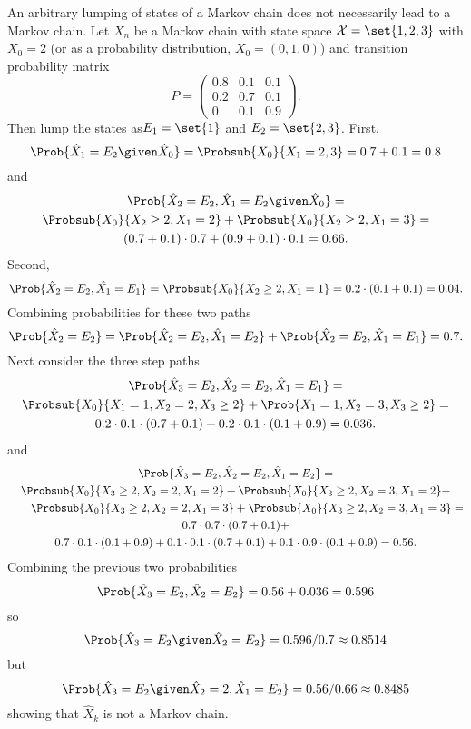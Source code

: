\documentclass[12pt]{article}
\begin{document}
\begin{example}
    An arbitrary lumping of states of a Markov chain does not
    necessarily lead to a Markov chain.  Let \( X_n \) be a Markov chain
    with state space \( \mathcal{X} = \set{1, 2, 3} \) with \( X_0 = 2 \)
    (or as a probability distribution, \( X_0 = (0,1,0) \)) and
    transition probability matrix
    \[
        P =
        \begin{pmatrix}
            0.8 & 0.1 & 0.1 \\
            0.2 & 0.7 & 0.1 \\
            0 & 0.1 & 0.9
        \end{pmatrix}
        .
      \] Then lump the states as\( E_1 = \set{1} \) and \( E_2 = \set{2,3}
      \).  First,
      \[
        \Prob{\hat{X}_1 = E_2 \given \hat{X}_0} =
        \Probsub{X_0}{X_1 = 2,3} = 0.7 + 0.1 = 0.8
      \] and
    \begin{multline*}
        \Prob{\hat{X}_2 = E_2, \hat{X}_1 = E_2 \given \hat{X}_0 } = \\
        \Probsub{X_0}{X_2 \ge 2, X_1 = 2} + \Probsub{X_0}{X_2 \ge 2, X_1 =
        3} = \\
        (0.7 + 0.1) \cdot 0.7 + (0.9 + 0.1) \cdot 0.1 = 0.66.
    \end{multline*}
    Second,
    \[
        \Prob{\hat{X}_2 = E_2, \hat{X_1} = E_1} = \Probsub{X_0}{ X_2 \ge
        2, X_1 = 1} = 0.2 \cdot (0.1 + 0.1) = 0.04.
    \] Combining probabilities for these two paths
    \[
        \Prob{\hat{X}_2 = E_2} = \Prob{\hat{X}_2 =E_2, \hat{X}_1 = E_2} +
        \Prob{\hat{X}_2=E_2, \hat{X}_1 = E_1} = 0.7.
    \] Next consider the three step paths
    \begin{multline*}
        \Prob{\hat{X}_3 = E_2, \hat{X}_2=E_2, \hat{X}_1=E_1} = \\
        \Probsub{X_0}{X_1=1, X_2=2, X_3 \ge 2} + \Prob{X_1=1, X_2=3, X_3 \ge 2}
        = \\
        0.2 \cdot 0.1 \cdot (0.7+0.1) + 0.2 \cdot 0.1 \cdot (0.1+0.9) =
        0.036.
    \end{multline*}
    and
    \begin{multline*}
        \Prob{\hat{X}_3 = E_2, \hat{X}_2=E_2, \hat{X}_1=E_2} = \\
        \Probsub{X_0}{X_3 \ge 2, X_2=2, X_1=2} + \Probsub{X_0}{X_3 \ge 2,
        X_2=3, X_1=2} +\\
        \qquad \Probsub{X_0}{X_3 \ge 2, X_2=2, X_1=3} + \Probsub{X_0}{X_3 \ge 2, X_2=3,
         X_1=3} = \\
       0.7 \cdot 0.7 \cdot (0.7 + 0.1) + \\
       0.7 \cdot 0.1 \cdot (0.1 + 0.9)
        + 0.1 \cdot 0.1 \cdot (0.7 + 0.1) + 0.1 \cdot 0.9 \cdot (0.1 +
        0.9) = 0.56.
    \end{multline*}
    Combining the previous two probabilities
    \[
        \Prob{\hat{X}_3 = E_2, \hat{X}_2 = E_2} = 0.56 + 0.036 = 0.596
    \] so
    \[
        \Prob{\hat{X}_3=E_2 \given \hat{X}_2 = E_2} = 0.596/0.7 \approx
        0.8514
    \] but
    \[
        \Prob{\hat{X}_3 = E_2 \given \hat{X}_2 = 2, \hat{X}_1=E_2} =
        0.56/0.66 \approx 0.8485
    \] showing that \( \hat{X}_k \) is not a Markov chain.
\end{example}
\end{document}
